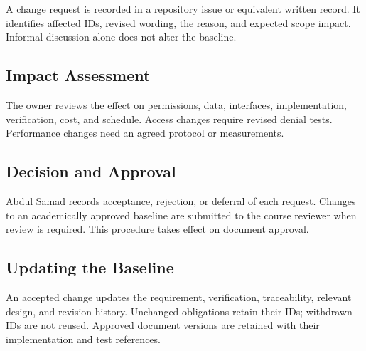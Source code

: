 \documentclass[11pt,letterpaper]{article}
\begin{document}
A change request is recorded in a repository issue or equivalent written record. It identifies affected IDs, revised wording, the reason, and expected scope impact. Informal discussion alone does not alter the baseline.\par

\subsection{Impact Assessment}

The owner reviews the effect on permissions, data, interfaces, implementation, verification, cost, and schedule. Access changes require revised denial tests. Performance changes need an agreed protocol or measurements.\par

\subsection{Decision and Approval}

Abdul Samad records acceptance, rejection, or deferral of each request. Changes to an academically approved baseline are submitted to the course reviewer when review is required. This procedure takes effect on document approval.\par

\subsection{Updating the Baseline}

An accepted change updates the requirement, verification, traceability, relevant design, and revision history. Unchanged obligations retain their IDs; withdrawn IDs are not reused. Approved document versions are retained with their implementation and test references.\par

\begingroup\small
\end{document}
